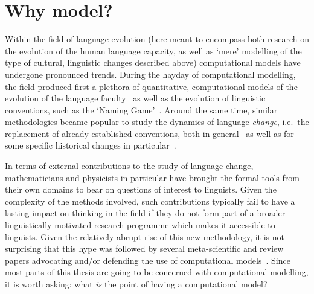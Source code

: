 \section{Why model?}

Within the field of language evolution (here meant to encompass both research on the evolution of the human language capacity, as well as `mere' modelling of the type of cultural, linguistic changes described above) computational models have undergone pronounced trends. %
During the hayday of computational modelling, the field produced first a plethora of quantitative, computational models of the evolution of the language faculty~\citep{Kirby1999,Nowak2001a} as well as the evolution of linguistic conventions, such as the `Naming Game'~\citep{Baronchelli2008}. Around the same time, similar methodologies became popular to study the dynamics of language \emph{change}, i.e.~the replacement of already established conventions, both in general~\citep{Niyogi1995,Niyogi1997,Arita1998,Nettle1999,Kataoka2000,Livingstone2000,DeOliveira2005,Niyogi2006,Wedel2006,Baxter2006,Wedel2007,Ettlinger2007,Ettlinger2007b,Ritt2009,Fagyal2010,Blythe2012,Gong2012,Otero-Espinar2013,Soskuthy2013,Pierrehumbert2014,Enke2016} as well as for some specific historical changes in particular~\citep{Yang2002,Pearl2007,Troutman2008,Baxter2009,Sonderegger2010,Swarup2012,Ritt2012,Kirby2013,Kirby2013cogsci}. %

In terms of external contributions to the study of language change, mathematicians and physicists in particular have brought the formal tools from their own domains to bear on questions of interest to linguists. Given the complexity of the methods involved, such contributions typically fail to have a lasting impact on thinking in the field if they do not form part of a broader linguistically-motivated research programme which makes it accessible to linguists. %
Given the relatively abrupt rise of this new methodology, it is not surprising that this hype was followed by several meta-scientific and review papers advocating and/or defending the use of computational models~\citep{Wang2004,DeBoer2006,Baker2008,Jaeger2009,Hruschka2009,Vogt2010,DeBoer2012EvoLang,Smith2016}.
Since most parts of this thesis are going to be concerned with computational modelling, it is worth asking: what \emph{is} the point of having a computational model?

